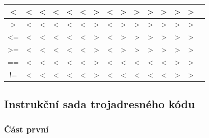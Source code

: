 \documentclass[a4paper, 12pt]{article}
\begin{document}
\begin{center}
\begin{tabular}{|c||c|c|c|c|c|c|c|c|c|c|c|c|c|c|}
\textless     & \textless & \textless & \textless & \textless & \textless & \textgreater & \textless & \textgreater        & \textgreater           & \textgreater         & \textgreater            & \textgreater & \textgreater \\ \hline
\textgreater  & \textless & \textless & \textless & \textless & \textless & \textgreater & \textless & \textgreater        & \textgreater           & \textgreater         & \textgreater            & \textgreater & \textgreater \\ \hline
\textless=    & \textless & \textless & \textless & \textless & \textless & \textgreater & \textless & \textgreater        & \textgreater           & \textgreater         & \textgreater            & \textgreater & \textgreater \\ \hline
\textgreater= & \textless & \textless & \textless & \textless & \textless & \textgreater & \textless & \textgreater        & \textgreater           & \textgreater         & \textgreater            & \textgreater & \textgreater \\ \hline
==            & \textless & \textless & \textless & \textless & \textless & \textgreater & \textless & \textless        & \textless           & \textless         & \textless            & \textgreater & \textgreater \\ \hline
!=            & \textless & \textless & \textless & \textless & \textless & \textgreater & \textless & \textless        & \textless           & \textless         & \textless            & \textgreater & \textgreater \\ \hline
\end{tabular}
\end{center}
\newpage

\subsection{Instrukční sada trojadresného kódu} \label{instrukce}

\subsubsection{Část první}
\end{document}
